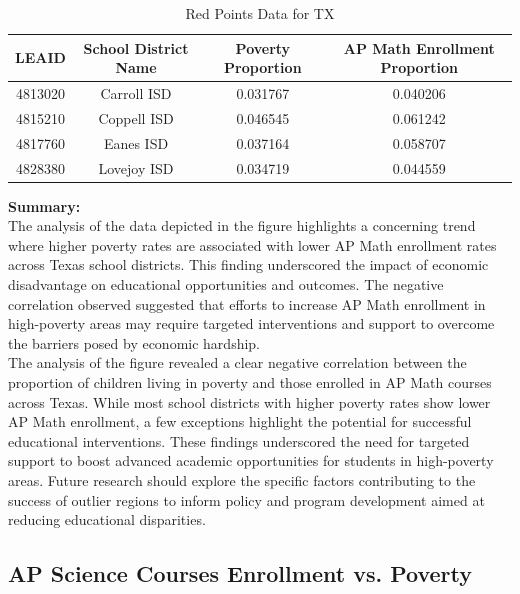 \documentclass[sn-mathphys-num]{sn-jnl}%
\theoremstyle{thmstyleone}%
\theoremstyle{thmstyletwo}%
\theoremstyle{thmstylethree}%
\begin{document}
{\begin{table}[h!]
\centering
\begin{tabular}{|c|c|c|c|}
\hline
\textbf{LEAID} & \textbf{School District Name} & \textbf{Poverty Proportion} & \textbf{AP Math Enrollment Proportion} \\
\hline
4813020 & Carroll ISD & 0.031767 & 0.040206 \\
\hline
4815210 & Coppell ISD & 0.046545 & 0.061242 \\
\hline
4817760 & Eanes ISD & 0.037164 & 0.058707 \\
\hline
4828380 & Lovejoy ISD & 0.034719 & 0.044559\\
\hline
\end{tabular}
\caption{Red Points Data for TX}
\label{tab:red_points}
\end{table}

\textbf{Summary:}\\

The analysis of the data depicted in the figure highlights a concerning trend where higher poverty rates are associated with lower AP Math enrollment rates across Texas school districts. This finding underscored the impact of economic disadvantage on educational opportunities and outcomes. The negative correlation observed suggested that efforts to increase AP Math enrollment in high-poverty areas may require targeted interventions and support to overcome the barriers posed by economic hardship.\\

The analysis of the figure revealed a clear negative correlation between the proportion of children living in poverty and those enrolled in AP Math courses across Texas. While most school districts with higher poverty rates show lower AP Math enrollment, a few exceptions highlight the potential for successful educational interventions. These findings underscored the need for targeted support to boost advanced academic opportunities for students in high-poverty areas. Future research should explore the specific factors contributing to the success of outlier regions to inform policy and program development aimed at reducing educational disparities.\\
\pagebreak

\subsection{AP Science Courses Enrollment vs. Poverty}

}
\end{document}
